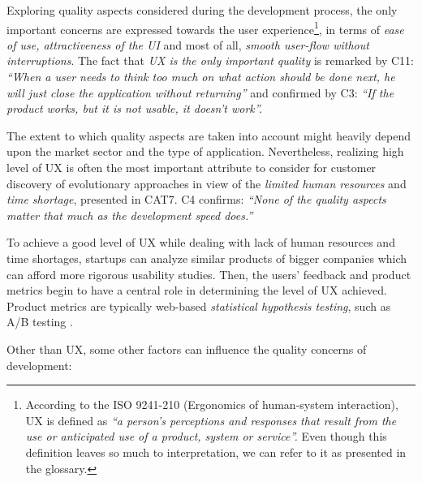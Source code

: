 \documentclass[10pt,journal,letterpaper,compsoc]{IEEEtran}
\begin{document}
Exploring quality aspects considered during the development process, the only 
important concerns are expressed towards the user experience\footnote{According 
to the ISO 9241-210 (Ergonomics of human-system interaction), UX is defined as 
\textit{``a person's perceptions and responses that result from the use or 
anticipated use of a product, system or service''.} Even though this definition 
leaves so much to interpretation, we can refer to it as presented in the 
glossary.}, in terms of \textit{ease of use, attractiveness of the UI} and most 
of all, \textit{smooth user-flow without interruptions}. The fact that 
\textit{UX is the only important quality} is remarked by C11: \textit{``When a 
user needs to think too much on what action should be done next, he will just 
close the application without returning''} and confirmed by C3: \textit{``If the 
product works, but it is not usable, it doesn't work''.}

The extent to which quality aspects are taken into account might heavily depend 
upon the market sector and the type of application. Nevertheless, realizing high 
level of UX  is often the most important attribute to consider for customer 
discovery of  evolutionary approaches in view of the \textit{limited human 
resources} and \textit{time shortage}, presented in CAT7. C4 confirms: 
\textit{``None of the quality aspects matter that much as the development speed 
does.''}

To achieve a good level of UX while dealing with lack of human resources and 
time shortages, startups can analyze similar products of bigger companies which 
can afford more rigorous usability studies. Then, the users' feedback and 
product metrics begin to have a central role in determining the level of UX 
achieved. Product metrics are typically web-based \textit{statistical hypothesis 
testing}, such as A/B testing \cite{AB}. 

Other than UX, some other factors can influence the quality concerns of 
development:
\end{document}

